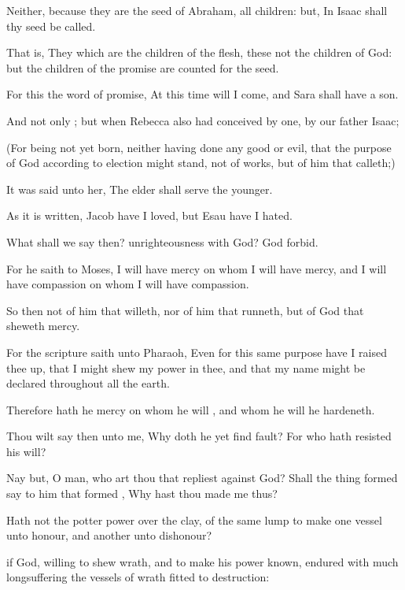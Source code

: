 {Neither,
because they
are the
seed of
Abraham,
{}
all
children:
but,
In
Isaac
shall
thy
seed be
called.

That
is, They which are the
children of the
flesh,
these
{}
not the
children of
God:
but the
children of the
promise are
counted
for the
seed.

For
this
{} the
word of
promise,
At
this
time will I
come,
and
Sara shall
have a
son.

And
not
only
{};
but
when
Rebecca
also
had
conceived
by
one,
{}
by
our
father
Isaac;

(For
{}
being not
yet
born,
neither having
done
any
good
or
evil,
that the
purpose of
God according
to
election might
stand,
not
of
works,
but
of him that
calleth;)

It was
said unto
her, The
elder shall
serve the
younger.

As it is
written,
Jacob have I
loved,
but
Esau have I
hated.


\par }{\PP {}What shall we
say
then?
{}
unrighteousness
with
God? God
forbid.

For he
saith to
Moses, I will have mercy
on
whom I will have
mercy,
and I will have compassion
on
whom I will have
compassion.

So
then
{}
not of him that
willeth,
nor of him that
runneth,
but of
God that sheweth
mercy.

For the
scripture
saith unto
Pharaoh, Even
for
this
same
purpose have I
raised
thee
up,
that I might
shew
my
power
in
thee,
and
that
my
name might be
declared
throughout
all the
earth.

Therefore hath he mercy
on
whom he
will
{},
and
whom he
will he
hardeneth.

Thou wilt
say
then unto
me,
Why doth
he
yet find
fault?
For
who hath
resisted
his
will?

Nay
but,
O
man,
who
art
thou that repliest
against
God?
Shall the thing
formed
say to him that
formed
{},
Why hast thou
made
me
thus?

Hath
not the
potter
power over the
clay,
of the
same
lump to
make
one
vessel
unto
honour,
and
another
unto
dishonour?

if
God,
willing to
shew
{}
wrath,
and to
make
his
power
known,
endured
with
much
longsuffering the
vessels of
wrath
fitted
to
destruction:

}
